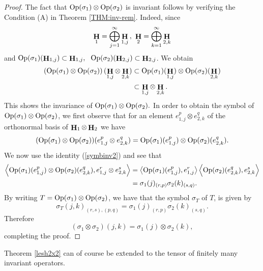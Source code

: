 \documentclass[a4paper,12pt,reqno]{amsart}
\renewcommand\eqref[1]{(\ref{#1})} %
\theoremstyle{definition}
\theoremstyle{remark}
\numberwithin{equation}{section}
\def\Op{{{\rm Op}}}
\def\Op{\text{\rm Op}}
\DeclareMathOperator{\Hi}{{\bf H}}
\begin{document}
\begin{proof} The fact that $\Op(\sigma_1)\otimes\Op(\sigma_2)$ is invariant follows by verifying the Condition (A) in  Theorem \ref{THM:inv-rem}. Indeed, since 
\[\Hi_1=\bigoplus\limits_{j=1}^{\infty}\Hi_{1,j}\, ,\,\, \Hi_2=\bigoplus\limits_{k=1}^{\infty}\Hi_{2,k} \]
and $\Op(\sigma_1)(\Hi_{1,j})\subset \Hi_{1,j},\,\, $
$ \Op(\sigma_2)(\Hi_{2,j})\subset \Hi_{2,j} $. We obtain %
\begin{align*}
 \left(\Op(\sigma_1)\otimes\Op(\sigma_2) \right)(\Hi_{1,j}\otimes\Hi_{2,k})&\subset \Op(\sigma_1)(\Hi_{1,j})\otimes \Op(\sigma_2)(\Hi_{2,k}) \\
 &\subset \Hi_{1,j}\otimes\Hi_{2,k}.
\end{align*}%
This shows the invariance of $\Op(\sigma_1)\otimes\Op(\sigma_2).$ In order to obtain the symbol of $\Op(\sigma_1)\otimes\Op(\sigma_2)$, we first observe that for an element $e_{1,j}^p\otimes e_{2,k}^q$ of the orthonormal basis of $\Hi_1\otimes \Hi_2$ we have
\begin{equation}\label{prinrh1}
(\Op(\sigma_1)\otimes\Op(\sigma_2))(e_{1,j}^p\otimes e_{2,k}^q)=\Op(\sigma_1)(e_{1,j}^p)\otimes\Op(\sigma_2)(e_{2,k}^q).
\end{equation}
We now use the identity \eqref{symbinv2} and see that  
\begin{align*}
\left\langle \Op(\sigma_1)(e_{1,j}^p)\otimes\Op(\sigma_2)(e_{2,k}^q), 
 e_{1,j}^r\otimes e_{2,k}^s\right\rangle &=\left\langle \Op(\sigma_1)(e_{1,j}^p), e_{1,j}^r\right\rangle\left\langle \Op(\sigma_2)(e_{2,k}^q), e_{2,k}^s\right\rangle\\
 &=\sigma_1(j)_{(r,p)}\sigma_2(k)_{(s,q)}.
 \end{align*}
By writing $T=\Op(\sigma_1)\otimes\Op(\sigma_2)$, we have that the symbol $\sigma_T$ of $T$, is given by
\[\sigma_T(j,k)_{(r,s),(p,q)}=\sigma_1(j)_{(r,p)}\sigma_2(k)_{(s,q)}.\]
Therefore
\[(\sigma_1\otimes\sigma_2)(j,k)=\sigma_1(j)\otimes\sigma_2(k),\]
completing the proof.
\end{proof}
Theorem \ref{lesh2x2} can of course  be extended to the tensor of finitely many invariant operators. 
\end{document}
